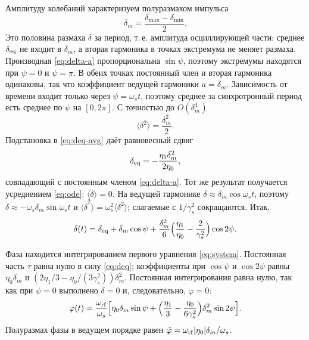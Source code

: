 Амплитуду колебаний характеризуем полуразмахом импульса
\begin{equation}
\label{eq:dm-def}
\delta_m=\frac{\delta_{\max}-\delta_{\min}}{2}.
\end{equation}
Это половина размаха $\delta$ за период, т.\,е. амплитуда осциллирующей части: среднее $\delta_{\mathrm{eq}}$ не входит в $\delta_m$, а вторая гармоника в точках экстремума не меняет размаха. Производная \eqref{eq:delta-a} пропорциональна $\sin\psi$, поэтому экстремумы находятся при $\psi=0$ и $\psi=\pi$. В обеих точках постоянный член и вторая гармоника одинаковы, так что коэффициент ведущей гармоники $a=\delta_m$. Зависимость от времени входит только через $\psi=\omega_st$, поэтому среднее за синхротронный период есть среднее по $\psi$ на $[0,2\pi]$. С точностью до $O(\delta_m^4)$
\begin{equation}
\label{eq:d2-avg}
\langle\delta^2\rangle=\frac{\delta_m^2}{2}.
\end{equation}
Подстановка в \eqref{eq:deq-avg} даёт равновесный сдвиг
\begin{equation}
\label{eq:deq}
\delta_{\mathrm{eq}}=-\frac{\eta_1\delta_m^2}{2\eta_0},
\end{equation}
совпадающий с постоянным членом \eqref{eq:delta-a}. Тот же результат получается усреднением \eqref{eq:ode}: $\langle\ddot\delta\rangle=0$. На ведущей гармонике $\delta\approx\delta_m\cos\omega_st$, поэтому $\dot\delta\approx-\omega_s\delta_m\sin\omega_st$ и $\langle\dot\delta^2\rangle=\omega_s^2\langle\delta^2\rangle$; слагаемые с $1/\gamma_s^2$ сокращаются. Итак,
\begin{equation}
\label{eq:delta-sol}
\delta(t)
=\delta_{\mathrm{eq}}
+\delta_m\cos\psi
+\frac{\delta_m^2}{6}\Bigl(\frac{\eta_1}{\eta_0}-\frac{2}{\gamma_s^2}\Bigr)\cos 2\psi.
\end{equation}

Фаза находится интегрированием первого уравнения \eqref{eq:system}. Постоянная часть $\tau$ равна нулю в силу \eqref{eq:deq}; коэффициенты при $\cos\psi$ и $\cos2\psi$ равны $\eta_0\delta_m$ и $(2\eta_1/3-\eta_0/(3\gamma_s^2))\delta_m^2$. Постоянная интегрирования равна нулю, так как при $\psi=0$ выполнено $\dot\delta=0$ и, следовательно, $\varphi=0$:
\begin{equation}
\label{eq:phi}
\varphi(t)
=\frac{\omega_{\mathrm{rf}}}{\omega_s}
\Bigl[
\eta_0\delta_m\sin\psi
+\Bigl(\frac{\eta_1}{3}-\frac{\eta_0}{6\gamma_s^2}\Bigr)\delta_m^2\sin 2\psi
\Bigr].
\end{equation}
Полуразмах фазы в ведущем порядке равен $\hat\varphi=\omega_{\mathrm{rf}}|\eta_0|\delta_m/\omega_s$.

